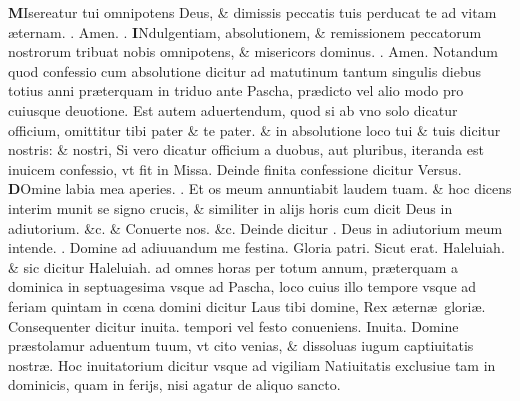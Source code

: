 \documentclass[a5paper,10pt]{book}
\makeatletter
\DeclareRobustCommand{\Vbar}{\vers@resp{-0.1em}{V}}
\DeclareRobustCommand{\Rbar}{\vers@resp{0pt}{R}}
\newcommand{\vers@resp@sym}{\raisebox{0.2ex}{\rotatebox[origin=c]{-20}{$\m@th\rceil$}}}
\newcommand{\vers@resp}[2]{%
  {\ooalign{\hidewidth\kern#1\vers@resp@sym\hidewidth\cr#2\cr}}%
}%
\def\ae{æ}
\def\oe{œ}
\makeatother
\begin{document}
\begin{multicols*}{2}
\lettrine[lines=2]{\bfseries \color{red} M}{}Isereatur \color{red} tui \color{black} omnipotens Deus, \& dimissis peccatis tuis perducat te ad vitam \ae ternam. \color{red} \Rbar . \color{black} Amen. \color{red} \Vbar . \color{black}
\lettrine[lines=2]{\bfseries \color{red} I}{}Ndulgentiam, absolutionem, \& remissionem peccatorum nostrorum tribuat nobis omnipotens, \& misericors dominus. \color{red} \Rbar . \color{black} Amen.
\newline {} \color{red} Notandum quod confessio cum absolutione dicitur ad matutinum tantum singulis diebus totius anni pr\ae terquam in triduo ante Pascha, pr\ae dicto vel alio modo pro cuiusque deuotione.
Est autem aduertendum, quod si ab vno solo dicatur officium, omittitur \color{black} tibi pater \color{red} \& \color{black} te pater. \color{red} \& in absolutione loco \color{black} tui \color{red} \& \color{black} tuis \color{red} dicitur \color{black} nostris: \color{red} \& \color{black} nostri, \color{red} Si vero dicatur officium a duobus, aut pluribus, iteranda %
est inuicem confessio, vt fit in Missa. \color{black}
\newline {} \color{red} Deinde finita confessione dicitur Versus. \color{black}
\lettrine[lines=2]{\bfseries \color{red} D}{}Omine labia mea aperies. \color{red} \Rbar . \color{black} Et os meum annuntiabit laudem tuam.
\color{red} \& hoc dicens interim munit se signo crucis, \& similiter in alijs horis cum dicit \color{black} Deus in adiutorium. \color{red} \&c. \& \color{black} Conuerte nos. \color{red} \&c. \color{black}
\newline {} \color{red} Deinde dicitur \Vbar . \color{black} Deus in adiutorium meum intende. \color{red} \Rbar . \color{black} Domine ad adiuuandum me festina. Gloria patri. Sicut erat. Haleluiah. \color{red} \& sic dicitur \color{black} Haleluiah. \color{red} ad omnes horas per totum annum, pr\ae terquam a dominica in septuagesima vsque ad Pascha, loco cuius illo tempore vsque ad feriam quintam in c\oe na domini dicitur \color{black} Laus tibi domine, Rex \ae tern\ae \ glori\ae . \color{red} Consequenter dicitur inuita. tempori vel festo conueniens. Inuita. \color{black} Domine pr\ae stolamur aduentum tuum, vt cito venias, \& dissoluas iugum captiuitatis nostr\ae .
\newline {} \color{red} Hoc inuitatorium dicitur vsque ad vigiliam Natiuitatis exclusiue tam in dominicis, quam in ferijs, nisi agatur de aliquo sancto.\color{black}

\end{multicols*}
\end{document}

